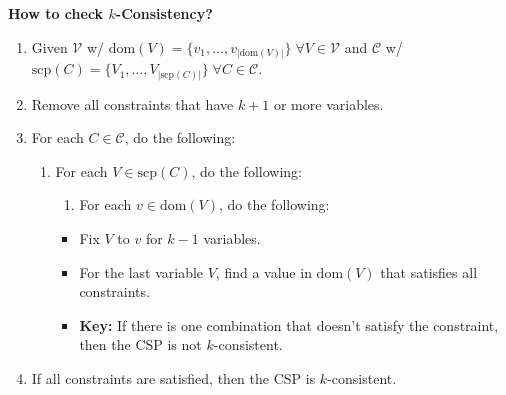 
\newpage

\begin{process} \textbf{How to check $k$-Consistency?} 
    \begin{enumerate}
        \item Given $\mathcal{V}$ w/ $\text{dom}(V) = \{v_1,\ldots,v_{|\text{dom}(V)|}\} \; \forall V \in \mathcal{V}$ and $\mathcal{C}$ w/ $\text{scp}(C) = \{V_1,\ldots,V_{|\text{scp}(C)|}\} \; \forall C \in \mathcal{C}$.
        \item Remove all constraints that have $k+1$ or more variables.
        \item For each $C \in \mathcal{C}$, do the following:
        \begin{enumerate}
            \item For each $V \in \text{scp}(C)$, do the following:
            \begin{enumerate}
                \item For each $v \in \text{dom}(V)$, do the following:
            \end{enumerate}
            \begin{itemize}
                \item Fix $V$ to $v$ for $k-1$ variables.
                \item For the last variable $V$, find a value in $\text{dom}(V)$ that satisfies all constraints.
                \item \textbf{Key:} If there is one combination that doesn't satisfy the constraint, then the CSP is not $k$-consistent.
            \end{itemize}
        \end{enumerate}
        \item If all constraints are satisfied, then the CSP is $k$-consistent.
    \end{enumerate}
\end{process}

